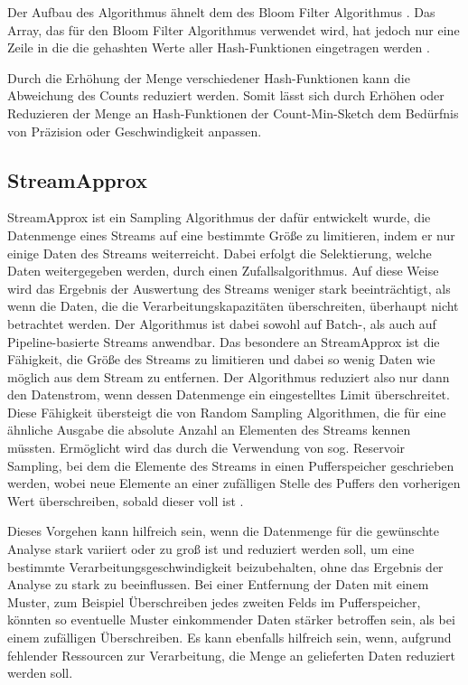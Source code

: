 Der Aufbau des Algorithmus ähnelt dem des Bloom Filter Algorithmus \cite{cormode2017}. 
Das Array, das für den Bloom Filter Algorithmus verwendet wird, 
hat jedoch nur eine Zeile in die die gehashten Werte aller Hash-Funktionen eingetragen werden \cite{cormode2017}.

Durch die Erhöhung der Menge verschiedener Hash-Funktionen kann die Abweichung des Counts reduziert werden. 
Somit lässt sich durch Erhöhen oder Reduzieren der Menge an Hash-Funktionen 
der Count-Min-Sketch dem Bedürfnis von Präzision oder Geschwindigkeit anpassen.

\subsection{StreamApprox}

StreamApprox ist ein Sampling Algorithmus der dafür entwickelt wurde, 
die Datenmenge eines Streams auf eine bestimmte Größe zu limitieren, 
indem er nur einige Daten des Streams weiterreicht. 
Dabei erfolgt die Selektierung, welche Daten weitergegeben werden, durch einen Zufallsalgorithmus. 
Auf diese Weise wird das Ergebnis der Auswertung des Streams weniger stark beeinträchtigt, 
als wenn die Daten, die die Verarbeitungskapazitäten überschreiten, 
überhaupt nicht betrachtet werden. 
Der Algorithmus ist dabei sowohl auf Batch-, als auch auf Pipeline-basierte Streams anwendbar.
Das besondere an StreamApprox ist die Fähigkeit, 
die Größe des Streams zu limitieren und dabei so wenig Daten wie möglich aus dem Stream zu entfernen. 
Der Algorithmus reduziert also nur dann den Datenstrom, wenn dessen Datenmenge ein eingestelltes Limit überschreitet. 
Diese Fähigkeit übersteigt die von Random Sampling Algorithmen, 
die für eine ähnliche Ausgabe die absolute Anzahl an Elementen des Streams kennen müssten. 
Ermöglicht wird das durch die Verwendung von sog. Reservoir Sampling, 
bei dem die Elemente des Streams in einen Pufferspeicher geschrieben werden, 
wobei neue Elemente an einer zufälligen Stelle des Puffers den vorherigen Wert überschreiben, sobald dieser voll ist \cite{quoc2017}. 

Dieses Vorgehen kann hilfreich sein, 
wenn die Datenmenge für die gewünschte Analyse stark variiert oder zu groß ist und reduziert werden soll, 
um eine bestimmte Verarbeitungsgeschwindigkeit beizubehalten, 
ohne das Ergebnis der Analyse zu stark zu beeinflussen.
Bei einer Entfernung der Daten mit einem Muster, zum Beispiel Überschreiben jedes zweiten Felds im Pufferspeicher, 
könnten so eventuelle Muster einkommender Daten stärker betroffen sein, als bei einem zufälligen Überschreiben.
Es kann ebenfalls hilfreich sein, 
wenn, aufgrund fehlender Ressourcen zur Verarbeitung, 
die Menge an gelieferten Daten reduziert werden soll.